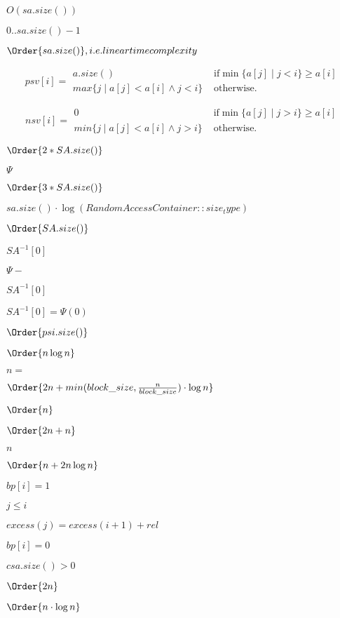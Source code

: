 \documentclass{article}
\begin{document}
$ O( sa.size() ) $
\pagebreak

$0..sa.size()-1$
\pagebreak

$ \Order{sa.size()}, i.e. linear time complexity $
\pagebreak

\[ psv[i] = \begin{array}{rl} a.size() &\mbox{ if} \min\{ a[j] \mid j<i \} \geq a[i] \\ max\{j\mid a[j] < a[i] \wedge j<i\} &\mbox{ otherwise.}\end{array} \]
\pagebreak

\[ nsv[i] = \begin{array}{rl} 0 &\mbox{ if} \min\{ a[j] \mid j>i \} \geq a[i] \\ min\{j\mid a[j] < a[i] \wedge j>i\} &\mbox{ otherwise.}\end{array} \]
\pagebreak

$ \Order{ 2*SA.size() }$
\pagebreak

$\Psi$
\pagebreak

$ \Order{3*SA.size() }$
\pagebreak

$ sa.size() \cdot \log(RandomAccessContainer::size_type)$
\pagebreak

$ \Order{ SA.size() } $
\pagebreak

$ SA^{-1}[0]$
\pagebreak

$\Psi-$
\pagebreak

$ SA^{-1}[0] $
\pagebreak

$ SA^{-1}[0]=\Psi(0) $
\pagebreak

$\Order{psi.size()}$
\pagebreak

$ \Order{n \log n} $
\pagebreak

$ n=$
\pagebreak

$ \Order{2n + min(block\_size, \frac{n}{block\_size} )\cdot \log n } $
\pagebreak

$ \Order{n} $
\pagebreak

$ \Order{2n + n} $
\pagebreak

$n$
\pagebreak

$ \Order{n + 2n\log n } $
\pagebreak

$ bp[i]=1 $
\pagebreak

$ j\leq i $
\pagebreak

$ excess(j) = excess(i+1)+rel $
\pagebreak

$ bp[i]=0 $
\pagebreak

$ csa.size()>0 $
\pagebreak

$ \Order{2n} $
\pagebreak

$ \Order{n \cdot \log n } $
\pagebreak
\end{document}

